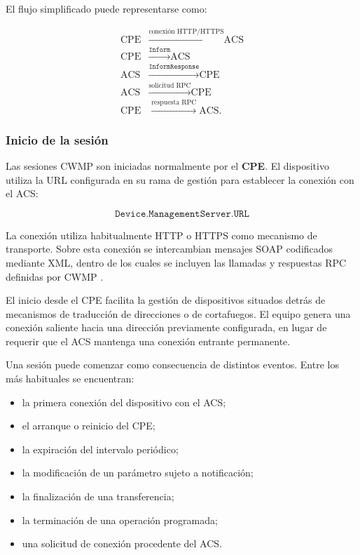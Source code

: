 El flujo simplificado puede representarse como:

\[
\begin{aligned}
    \text{CPE}
    &\xrightarrow{\text{conexión HTTP/HTTPS}}
    \text{ACS}\\
    \text{CPE}
    &\xrightarrow{\texttt{Inform}}
    \text{ACS}\\
    \text{ACS}
    &\xrightarrow{\texttt{InformResponse}}
    \text{CPE}\\
    \text{ACS}
    &\xrightarrow{\text{solicitud RPC}}
    \text{CPE}\\
    \text{CPE}
    &\xrightarrow{\text{respuesta RPC}}
    \text{ACS}.
\end{aligned}
\]


\subsubsection*{Inicio de la sesión}

Las sesiones CWMP son iniciadas normalmente por el
\textbf{CPE}. El dispositivo utiliza la URL configurada en su rama de
gestión para establecer la conexión con el ACS:

\[
    \texttt{Device.ManagementServer.URL}
\]

La conexión utiliza habitualmente HTTP o HTTPS como mecanismo de
transporte. Sobre esta conexión se intercambian mensajes SOAP codificados
mediante XML, dentro de los cuales se incluyen las llamadas y respuestas
RPC definidas por CWMP \cite{bbf_tr069}.

El inicio desde el CPE facilita la gestión de dispositivos situados detrás
de mecanismos de traducción de direcciones o de cortafuegos. El equipo
genera una conexión saliente hacia una dirección previamente configurada,
en lugar de requerir que el ACS mantenga una conexión entrante permanente.

Una sesión puede comenzar como consecuencia de distintos eventos. Entre
los más habituales se encuentran:

\begin{itemize}
    \item la primera conexión del dispositivo con el ACS;
    \item el arranque o reinicio del CPE;
    \item la expiración del intervalo periódico;
    \item la modificación de un parámetro sujeto a notificación;
    \item la finalización de una transferencia;
    \item la terminación de una operación programada;
    \item una solicitud de conexión procedente del ACS.
\end{itemize}

